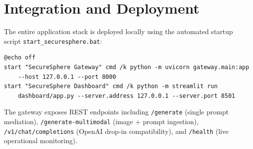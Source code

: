 \section{Integration and Deployment}
The entire application stack is deployed locally using the automated startup script \texttt{start\_securesphere.bat}:
\begin{verbatim}
@echo off
start "SecureSphere Gateway" cmd /k python -m uvicorn gateway.main:app 
    --host 127.0.0.1 --port 8000
start "SecureSphere Dashboard" cmd /k python -m streamlit run 
    dashboard/app.py --server.address 127.0.0.1 --server.port 8501
\end{verbatim}
The gateway exposes REST endpoints including \texttt{/generate} (single prompt mediation), \texttt{/generate-multimodal} (image + prompt ingestion), \texttt{/v1/chat/completions} (OpenAI drop-in compatibility), and \texttt{/health} (live operational monitoring).
